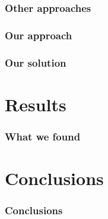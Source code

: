 \documentclass{beamer}
\begin{document}
\begin{frame}
\frametitle{Other approaches}
\end{frame}

\begin{frame}
\frametitle{Our approach}
\end{frame}

\begin{frame}
\frametitle{Our solution}
\end{frame}

\section{Results}

\begin{frame}
\frametitle{What we found}
\end{frame}

\section{Conclusions}

\begin{frame}
\frametitle{Conclusions}
\end{frame}
\end{document}

